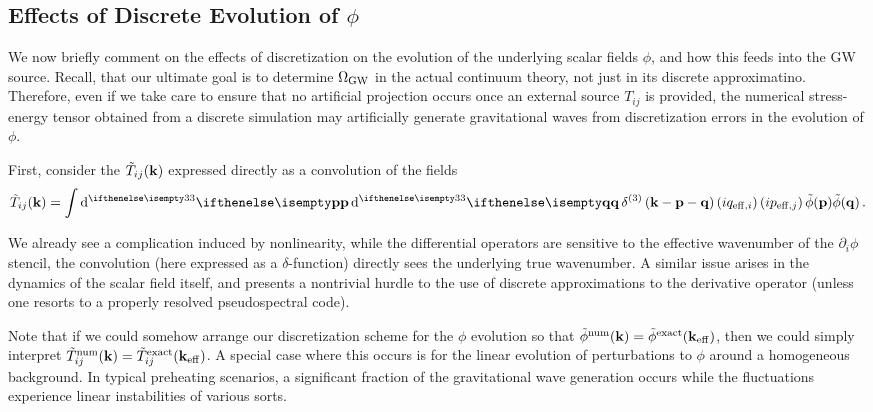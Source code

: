 \documentclass{revtex4}
\begin{document}
\subsection{Effects of Discrete Evolution of $\phi$}
We now briefly comment on the effects of discretization on the evolution of the underlying scalar fields $\phi$, and how this feeds into the GW source.
Recall, that our ultimate goal is to determine $\Omega_{\rm GW}$ in the actual continuum theory, not just in its discrete approximatino.
Therefore, even if we take care to ensure that no artificial projection occurs once an external source $T_{ij}$ is provided, the numerical stress-energy tensor obtained from a discrete simulation may artificially generate gravitational waves from discretization errors in the evolution of $\phi$.

First, consider the $\tilde{T}_{ij}({\bf k})$ expressed directly as a convolution of the fields
\begin{equation}
  \tilde{T}_{ij}(\kvec) = \int \ud[3]{\myvec{p}}\ud[3]{\myvec{q}} \delta^{\rm (3)}\left(\kvec - \myvec{p}-\myvec{q}\right)\left(iq_{{\rm eff},i}\right)\left(ip_{{\rm eff},j}\right)\tilde{\phi}(\myvec{p})\tilde{\phi}(\myvec{q}) \, .
\end{equation}

We already see a complication induced by nonlinearity, while the differential operators are sensitive to the effective wavenumber of the $\partial_i\phi$ stencil, the convolution (here expressed as a $\delta$-function) directly sees the underlying true wavenumber.
A similar issue arises in the dynamics of the scalar field itself, and presents a nontrivial hurdle to the use of discrete approximations to the derivative operator (unless one resorts to a properly resolved pseudospectral code).

Note that if we could somehow arrange our discretization scheme for the $\phi$ evolution so that $\tilde{\phi}^{\rm num}({\bf k}) = \tilde{\phi}^{\rm exact}({\bf k}_{\rm eff})$,
then we could simply interpret $\tilde{T}_{ij}^{\rm num}({\bf k}) = \tilde{T}_{ij}^{\rm exact}({\bf k}_{\rm eff})$.
A special case where this occurs is for the linear evolution of perturbations to $\phi$ around a homogeneous background.
In typical preheating scenarios, a significant fraction of the gravitational wave generation occurs while the fluctuations experience linear instabilities of various sorts.
\end{document}
